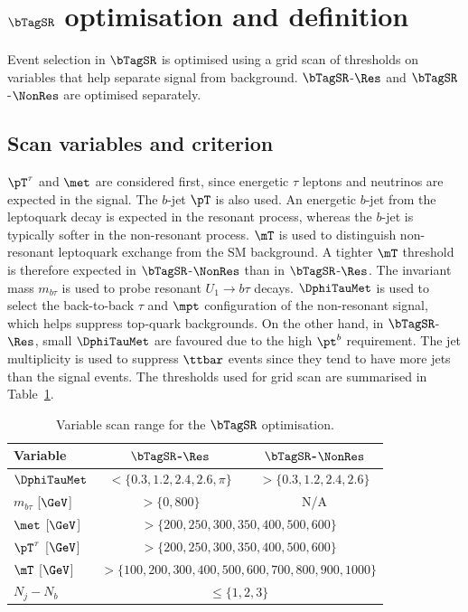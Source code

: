 \section[$\bTagSR$ optimisation and definition]{$\bTagSR$ optimisation and definition}
\label{sec:ch7_sr1b}

Event selection in $\bTagSR$ is optimised using a grid scan of thresholds on variables that help separate signal from background. $\bTagSR$-$\Res$ and $\bTagSR$-$\NonRes$ are optimised separately.

\subsection{Scan variables and criterion}
\label{subsec:ch7_scan}

$\pT^\tau$ and $\met$ are considered first, since energetic $\tau$ leptons and neutrinos are expected in the signal.
The $b$-jet $\pT$ is also used. An energetic $b$-jet from the leptoquark decay is expected in the resonant process, whereas the $b$-jet is typically softer in the non-resonant process. 
$\mT$ is used to distinguish non-resonant leptoquark exchange from the SM background.
A tighter $\mT$ threshold is therefore expected in $\bTagSR$-$\NonRes$ than in $\bTagSR$-$\Res$.
The invariant mass $m_{b\tau}$ is used to probe resonant $U_1\to b\tau$ decays.
$\DphiTauMet$ is used to select the back-to-back $\tau$ and $\mpt$ configuration of the non-resonant signal, which helps suppress top-quark backgrounds.
On the other hand, in $\bTagSR$-$\Res$, small $\DphiTauMet$ are favoured due to the high $\pt^{b}$ requirement.
The jet multiplicity is used to suppress $\ttbar$ events since they tend to have more jets than the signal events.
The thresholds used for grid scan are summarised in Table~\ref{tab:ch7_scan_variables}.

\begin{table}[htbp]
    \centering
    \small
    \caption{Variable scan range for the $\bTagSR$ optimisation.}
    \label{tab:ch7_scan_variables}
    \begin{tabular}{lcc}
        \toprule
        Variable & $\bTagSR$-$\Res$ & $\bTagSR$-$\NonRes$ \\
        \midrule
        $\DphiTauMet$ & $<\{0.3,1.2,2.4,2.6,\pi\}$ & $>\{0.3,1.2,2.4,2.6\}$ \\
        $m_{b\tau}$ [$\GeV$] & $>\{0,800\}$ & N/A \\
        $\met$ [$\GeV$] & \multicolumn{2}{c}{$>\{200,250,300,350,400,500,600\}$} \\
        $\pT^\tau$ [$\GeV$] & \multicolumn{2}{c}{$>\{200,250,300,350,400,500,600\}$} \\
        $\mT$ [$\GeV$] & \multicolumn{2}{c}{$>\{100,200,300,400,500,600,700,800,900,1000\}$} \\
        $N_j-N_b$ & \multicolumn{2}{c}{$\leq\{1,2,3\}$} \\
        \bottomrule
    \end{tabular}
\end{table}

